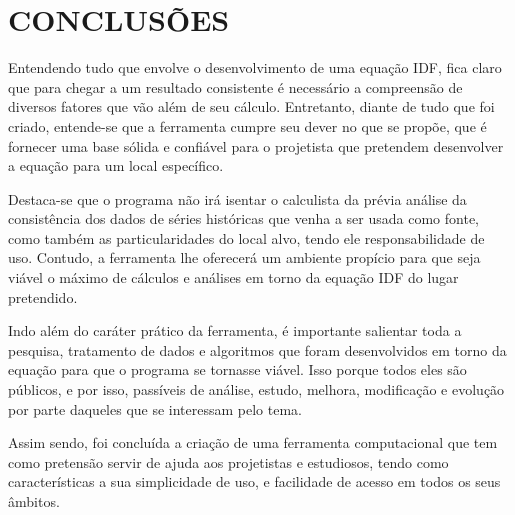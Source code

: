 \chapter{CONCLUSÕES}

Entendendo tudo que envolve o desenvolvimento de uma equação IDF, fica claro que para chegar a um resultado consistente é necessário a compreensão de diversos fatores que vão além de seu cálculo. Entretanto, diante de tudo que foi criado, entende-se que a ferramenta cumpre seu dever no que se propõe, que é fornecer uma base sólida e confiável para o projetista que pretendem desenvolver a equação para um local específico. 

Destaca-se que o programa não irá isentar o calculista da prévia análise da consistência dos dados de séries históricas que venha a ser usada como fonte, como também as particularidades do local alvo, tendo ele responsabilidade de uso. Contudo, a ferramenta lhe oferecerá um ambiente propício para que seja viável o máximo de cálculos e análises em torno da equação IDF do lugar pretendido.

Indo além do caráter prático da ferramenta, é importante salientar toda a pesquisa, tratamento de dados e algoritmos que foram desenvolvidos em torno da equação para que o programa se tornasse viável. Isso porque todos eles são públicos, e por isso, passíveis de análise, estudo, melhora, modificação e evolução por parte daqueles que se interessam pelo tema.

Assim sendo, foi concluída a criação de uma ferramenta computacional que tem como pretensão servir de ajuda aos projetistas e estudiosos, tendo como características a sua simplicidade de uso, e facilidade de acesso em todos os seus âmbitos.
